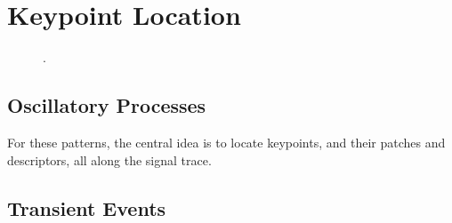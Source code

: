 
\section{Keypoint Location}

\begin{figure}[h!]
\centering
{}
\caption[Keypoint Locations]{}.
\label{fig:alpharesults}
\end{figure}

\subsection{Oscillatory Processes}

For these patterns, the central idea is to locate keypoints, and their patches and descriptors, all along the signal trace. 

\subsection{Transient Events}

